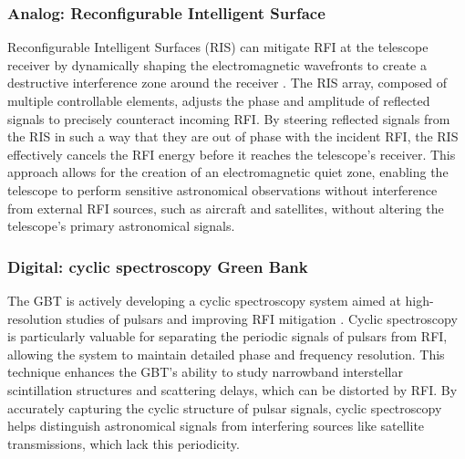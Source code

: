 \subsubsection{Analog: Reconfigurable Intelligent Surface}

Reconfigurable Intelligent Surfaces (RIS) can mitigate RFI at the telescope receiver by dynamically shaping the electromagnetic wavefronts to create a destructive interference zone around the receiver \citep{zou2022scisrs,wei2024ris,wei2023multistage}. The RIS array, composed of multiple controllable elements, adjusts the phase and amplitude of reflected signals to precisely counteract incoming RFI. By steering reflected signals from the RIS in such a way that they are out of phase with the incident RFI, the RIS effectively cancels the RFI energy before it reaches the telescope’s receiver. This approach allows for the creation of an electromagnetic quiet zone, enabling the telescope to perform sensitive astronomical observations without interference from external RFI sources, such as aircraft and satellites, without altering the telescope’s primary astronomical signals.


\subsubsection{Digital: cyclic spectroscopy Green Bank}

The GBT is actively developing a cyclic spectroscopy system aimed at high-resolution studies of pulsars and improving RFI mitigation \citep{dolch2021deconvolving}. Cyclic spectroscopy is particularly valuable for separating the periodic signals of pulsars from RFI, allowing the system to maintain detailed phase and frequency resolution. This technique enhances the GBT’s ability to study narrowband interstellar scintillation structures and scattering delays, which can be distorted by RFI. By accurately capturing the cyclic structure of pulsar signals, cyclic spectroscopy helps distinguish astronomical signals from interfering sources like satellite transmissions, which lack this periodicity.

